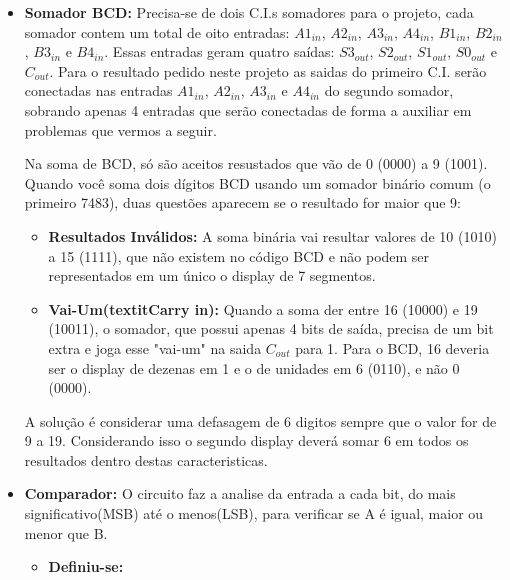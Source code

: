 \documentclass[11pt]{report}         %
\begin{document}
\begin {itemize}

\item \textbf{Somador BCD:} Precisa-se de dois C.I.s somadores para o projeto, cada somador contem um total de oito entradas: $A1_{in}$, $A2_{in}$, $A3_{in}$, $A4_{in}$, $B1_{in}$, 
$B2_{in}$, $B3_{in}$ e $B4_{in}$. Essas entradas geram quatro saídas: $S3_{out}$, $S2_{out}$, $S1_{out}$, $S0_{out}$ e $C_{out}$. Para o resultado pedido 
neste projeto as saidas do primeiro C.I. serão conectadas nas entradas $A1_{in}$, $A2_{in}$, $A3_{in}$ e $A4_{in}$ do segundo somador, sobrando apenas 
4 entradas que serão conectadas de forma a auxiliar em problemas que vermos a seguir.

Na soma de BCD, só são aceitos resustados que vão de 0 (0000) a 9 (1001). Quando você soma dois dígitos BCD usando um somador binário comum (o primeiro 7483), 
duas questões aparecem se o resultado for maior que 9:

\begin {itemize}

\item \textbf{Resultados Inválidos:} A soma binária vai resultar valores de 10 (1010) a 15 (1111), que não existem no código BCD e não podem 
ser representados em um único o display de 7 segmentos.

\item \textbf{Vai-Um(textit{Carry in}):} Quando a soma der entre 16 (10000) e 19 (10011), o somador, que possui apenas 4 bits de saída, precisa de um bit extra 
e joga esse "vai-um" na saida $C_{out}$ para 1. Para o BCD, 16 deveria ser o display de dezenas em 1 e o de unidades em 6 (0110), e não 0 (0000).

\end {itemize}

A solução é considerar uma defasagem de 6 digitos sempre que o valor for de 9 a 19. Considerando isso o segundo display deverá somar 6 em todos os resultados 
dentro destas caracteristicas.

\item \textbf{Comparador:} O circuito faz a analise da entrada a cada bit, do mais significativo(MSB) até o menos(LSB), para verificar se A é igual, maior 
ou menor que B.

\begin{itemize}

\item \textbf{Definiu-se:} 

\begin {itemize} 


\end{itemize}
\end{itemize}
\end{itemize}
\end{document}
